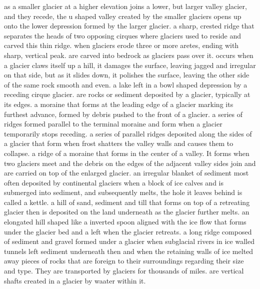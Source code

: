		 as a smaller glacier at a higher elevation joins a lower, but larger valley glacier, and they recede, the u shaped valley created by the smaller glaciers opens up onto the lower depression formed by the larger glacier.
		 a sharp, crested ridge that separates the heads of two opposing cirques where glaciers used to reside and carved this thin ridge.
		when glaciers erode three or more aretes, ending with sharp, vertical peak.
		 are carved into bedrock as glaciers pass over it.
		 occurs when a glacier claws itself up a hill, it damages the surface, leaving jagged and irregular on that side, but as it slides down, it polishes the surface, leaving the other side of the same rock smooth and even.
		 a lake left in a bowl shaped depression by a receding cirque glacier.
		 are rocks or sediment deposited by a glacier, typically at its edges.
		 a moraine that forms at the leading edge of a glacier marking its furthest advance, formed by debris pushed to the front of a glacier.
		 a series of ridges formed parallel to the terminal moraine and form when a glacier temporarily stops receding.
		 a series of parallel ridges deposited along the sides of a glacier that form when frost shatters the valley walls and causes them to collapse.
		  a ridge of a moraine that forms in the center of a valley. It forms when two glaciers meet and the debris on the edges of the adjacent valley sides join and are carried on top of the enlarged glacier.
		 an irregular blanket of sediment most often deposited by continental glaciers
		 when a block of ice calves and is submerged into sediment, and subsequently melts, the hole it leaves behind is called a kettle.
		 a hill of sand, sediment and till that forms on top of a retreating glacier then is deposited on the land underneath as the glacier further melts.
		 an elongated hill shaped like a inverted spoon aligned with the ice flow that forms under the glacier bed and a left when the glacier retreats.
		 a long ridge composed of sediment and gravel formed under a glacier when subglacial rivers in ice walled tunnels left sediment underneath then and when the retaining walls of ice melted away
		 pieces of rocks that are foreign to their surroundings regarding their size and type. They are transported by glaciers for thousands of miles.
		 are vertical shafts created in a glacier by waater within it.